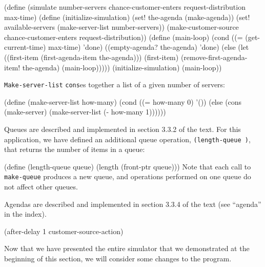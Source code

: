 \code
(define (simulate number-servers
                  chance-customer-enters
                  request-distribution
                  max-time)
  (define (initialize-simulation)
    (set! the-agenda (make-agenda))
    (set! available-servers
          (make-server-list number-servers))
    (make-customer-source chance-customer-enters
                          request-distribution))
  (define (main-loop)
    (cond ((= (get-current-time) max-time) 'done)
          ((empty-agenda? the-agenda) 'done)
          (else (let ((first-item (first-agenda-item the-agenda)))
                  (first-item)
                  (remove-first-agenda-item! the-agenda)
                  (main-loop)))))
  (initialize-simulation)
  (main-loop))
\uncode

{\tt Make-server-list} {\tt cons}es together a list 
of a given number of servers:

\code
(define (make-server-list how-many)
  (cond ((= how-many 0) '())
        (else (cons (make-server)
                    (make-server-list (- how-many 1))))))
\uncode


Queues are described and implemented in section 3.3.2 of the text.
For this application, we have defined an additional queue operation,
{\tt (length-queue )}, that returns the number of items in a queue:

\code
(define (length-queue queue)
  (length (front-ptr queue)))
\uncode\noindent
 Note that each call to {\tt make-queue} produces a new queue, and operations
performed on one queue do not affect other queues.

Agendas are described and implemented in section 3.3.4 of the text
(see ``agenda'' in the index).




\excode
(after-delay 1 customer-source-action)
\unexcode{}

\endex


Now that we have presented the entire simulator that we demonstrated
at the beginning of this section, we will consider some changes to
the program.

